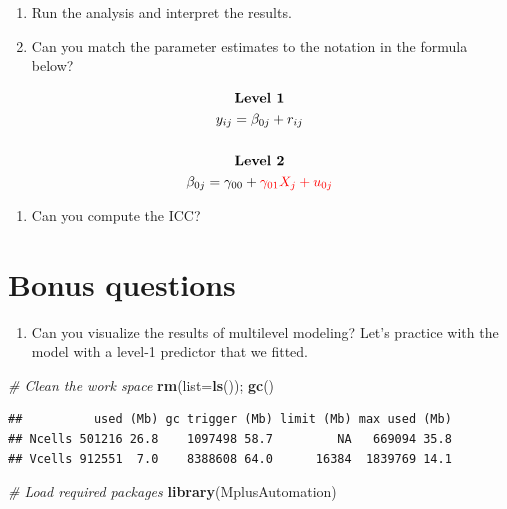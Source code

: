 \documentclass[
]{book}
\newenvironment{Shaded}{\begin{snugshade}}{\end{snugshade}}
\newcommand{\AttributeTok}[1]{\textcolor[rgb]{0.13,0.29,0.53}{#1}}
\newcommand{\CommentTok}[1]{\textcolor[rgb]{0.56,0.35,0.01}{\textit{#1}}}
\newcommand{\FunctionTok}[1]{\textcolor[rgb]{0.13,0.29,0.53}{\textbf{#1}}}
\newcommand{\NormalTok}[1]{#1}
\providecommand{\tightlist}{%
  \setlength{\itemsep}{0pt}\setlength{\parskip}{0pt}}
\begin{document}
\begin{enumerate}
\def\labelenumi{\arabic{enumi}.}
\setcounter{enumi}{1}
\item
  Run the analysis and interpret the results.
\item
  Can you match the parameter estimates to the notation in the formula below?
\end{enumerate}

\[
\begin{gathered}
\textbf{Level 1} \\
y_{ij}=\beta_{0j} + r_{ij} \\ \\
\textbf{Level 2} \\
\beta_{0j}=\gamma_{00} + \color{red}{\gamma_{01}X_{j}} + u_{0j}
\end{gathered}
\]

\begin{enumerate}
\def\labelenumi{\arabic{enumi}.}
\setcounter{enumi}{3}
\tightlist
\item
  Can you compute the ICC?
\end{enumerate}

\section{Bonus questions}\label{bonus-questions-3}

\begin{enumerate}
\def\labelenumi{\arabic{enumi}.}
\tightlist
\item
  Can you visualize the results of multilevel modeling? Let's practice with the model with a level-1 predictor that we fitted.
\end{enumerate}

\begin{Shaded}
\begin{Highlighting}[]
\CommentTok{\# Clean the work space}
\FunctionTok{rm}\NormalTok{(}\AttributeTok{list=}\FunctionTok{ls}\NormalTok{()); }\FunctionTok{gc}\NormalTok{()}
\end{Highlighting}
\end{Shaded}

\begin{verbatim}
##          used (Mb) gc trigger (Mb) limit (Mb) max used (Mb)
## Ncells 501216 26.8    1097498 58.7         NA   669094 35.8
## Vcells 912551  7.0    8388608 64.0      16384  1839769 14.1
\end{verbatim}

\begin{Shaded}
\begin{Highlighting}[]
\CommentTok{\# Load required packages}
\FunctionTok{library}\NormalTok{(MplusAutomation)}
\end{Highlighting}
\end{Shaded}
\end{document}
